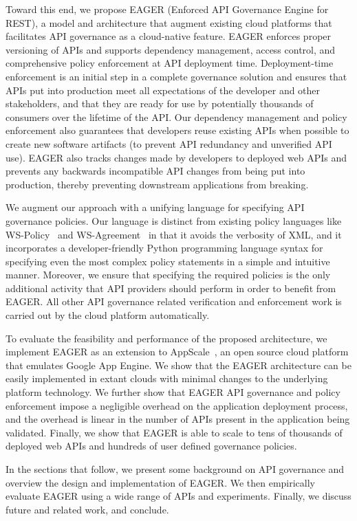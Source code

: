 Toward this end, we propose EAGER (Enforced API Governance Engine for REST), 
a model and architecture that augment existing
cloud platforms that facilitates API governance as a 
cloud-native feature. EAGER enforces proper versioning of APIs and supports dependency 
management, access control, and comprehensive policy enforcement at API deployment time. 
Deployment-time enforcement is an initial step in a complete governance
solution and ensures that APIs put into production meet all expectations of
the developer and other stakeholders, and that they are ready for use
by potentially thousands of consumers over the lifetime of the API.
Our dependency management and policy enforcement also guarantees that 
developers reuse existing APIs when possible to create new software artifacts
(to prevent API redundancy and unverified API use).
EAGER also tracks changes made by developers to deployed web APIs and prevents
any backwards incompatible API changes from being put into production, 
thereby preventing downstream applications from breaking.

We augment our approach with a unifying language for specifying 
API governance policies. Our language is distinct from 
existing policy languages like WS-Policy~\cite{WSPolicy,soagovstandard} and
WS-Agreement~\cite{WSAgreement} in that it avoids the verbosity of XML, 
and it incorporates a developer-friendly Python programming language syntax for 
specifying even the most complex policy statements in a simple and 
intuitive manner. Moreover, we ensure that specifying the required policies 
is the only additional activity that API providers should perform in
order to benefit from EAGER. All other API governance related verification and 
enforcement work is carried out by the cloud platform automatically.

To evaluate the feasibility and performance of the proposed 
architecture, we implement EAGER as an extension to AppScale~\cite{appscale13}, 
an open source
cloud platform that emulates Google App Engine. We show that the EAGER 
architecture can be easily implemented in extant clouds with
minimal changes to the underlying platform technology. We further show that 
EAGER API governance and policy enforcement impose a negligible 
overhead on the application deployment process, and the overhead
is linear in the number of APIs present in the application being validated.  
Finally, we show that EAGER is able to
scale to tens of thousands of deployed web APIs and hundreds of user 
defined governance policies.

In the sections that follow, we present some background on API governance
and overview the design and implementation of
EAGER. We then empirically evaluate EAGER using a wide range of APIs and
experiments.  Finally, we discuss future and related work, and conclude.


